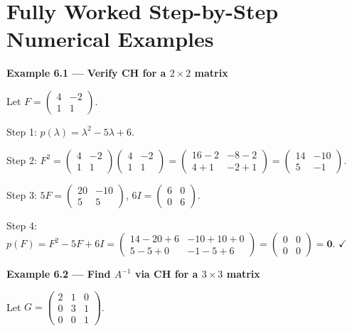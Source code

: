 \documentclass[12pt,a4paper]{article}
\begin{document}
\section{Fully Worked Step-by-Step Numerical Examples}

\textbf{Example 6.1 --- Verify CH for a $2\times2$ matrix}

Let $F = \begin{pmatrix} 4 & -2 \\ 1 & 1 \end{pmatrix}$.

Step 1: $p(\lambda) = \lambda^{2} - 5\lambda + 6$.

Step 2: $F^{2} = \begin{pmatrix}4&-2\\1&1\end{pmatrix}\begin{pmatrix}4&-2\\1&1\end{pmatrix}
= \begin{pmatrix}16-2&-8-2\\4+1&-2+1\end{pmatrix} = \begin{pmatrix}14&-10\\5&-1\end{pmatrix}$.

Step 3: $5F = \begin{pmatrix}20&-10\\5&5\end{pmatrix}$, $6I = \begin{pmatrix}6&0\\0&6\end{pmatrix}$.

Step 4: $p(F) = F^{2} - 5F + 6I = \begin{pmatrix}14-20+6&-10+10+0\\5-5+0&-1-5+6\end{pmatrix} = \begin{pmatrix}0&0\\0&0\end{pmatrix} = \mathbf{0}$. $\checkmark$

\bigskip

\textbf{Example 6.2 --- Find $A^{-1}$ via CH for a $3\times3$ matrix}

Let $G = \begin{pmatrix} 2 & 1 & 0 \\ 0 & 3 & 1 \\ 0 & 0 & 1 \end{pmatrix}$.
\end{document}
